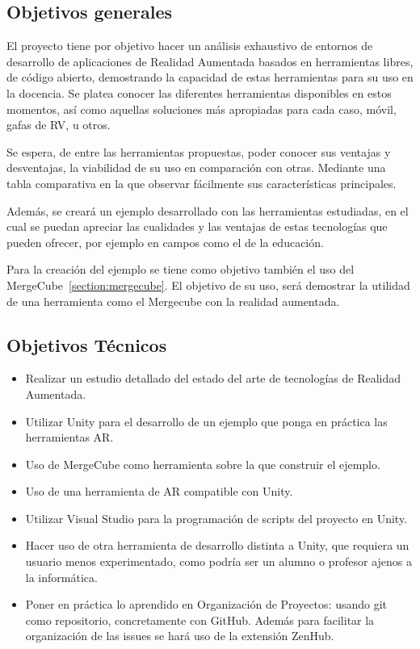 
\subsection{Objetivos generales}
El proyecto tiene por objetivo hacer un análisis exhaustivo de entornos de desarrollo de aplicaciones de Realidad Aumentada basados en herramientas libres, de código abierto, demostrando la capacidad de estas herramientas para su uso en la docencia. Se platea conocer las diferentes herramientas disponibles en estos momentos, así como aquellas soluciones más apropiadas para cada caso, móvil, gafas de RV, u otros.

Se espera, de entre las herramientas propuestas, poder conocer sus ventajas y desventajas, la viabilidad de su uso en comparación con otras. Mediante una tabla comparativa en la que observar fácilmente sus características principales.

Además, se creará un ejemplo desarrollado con las herramientas estudiadas, en el cual se puedan apreciar las cualidades y las ventajas de estas tecnologías que pueden ofrecer, por ejemplo en campos como el de la educación.

Para la creación del ejemplo se tiene como objetivo también el uso del MergeCube~\ref{section:mergecube}. El objetivo de su uso, será demostrar la utilidad de una herramienta como el Mergecube con la realidad aumentada.

 

\subsection{Objetivos Técnicos}
\begin{itemize}
\item Realizar un estudio detallado del estado del arte de tecnologías de Realidad Aumentada. 	
\item Utilizar Unity para el desarrollo de un ejemplo que ponga en práctica las herramientas AR.
\item Uso de MergeCube como herramienta sobre la que construir el ejemplo.
\item Uso de una herramienta de AR compatible con Unity.
\item Utilizar Visual Studio para la programación de scripts del proyecto en Unity.
\item Hacer uso de otra herramienta de desarrollo distinta a Unity, que requiera un usuario menos experimentado, como podría ser un alumno o profesor ajenos a la informática.
\item Poner en práctica lo aprendido en Organización de Proyectos: usando git como repositorio, concretamente con GitHub. Además para facilitar la organización de las issues  se hará uso de la extensión ZenHub.

	
\end{itemize}

